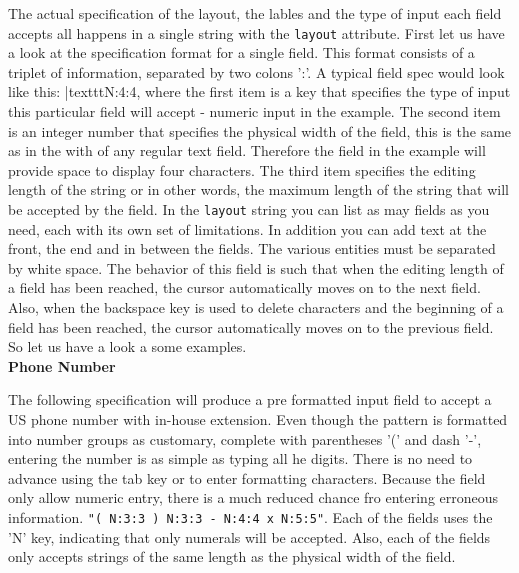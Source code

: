 The actual specification of the layout, the lables and the type of input
each field accepts all happens in a single string with the
\texttt{layout} attribute. First let us have a look at the specification
format for a single field. This format consists of a triplet of
information, separated by two colons ':'. A typical field spec would
look like this: |texttt{N:4:4}, where the first item is a key that
specifies the type of input this particular field will accept - numeric
input in the example. The second item is an integer number that
specifies the physical width of the field, this is the same as in the
with of any regular text field. Therefore the field in the example will
provide space to display four characters. The third item specifies the
editing length of the string or in other words, the maximum length of
the string that will be accepted by the field. In the \texttt{layout}
string you can list as may fields as you need, each with its own set of
limitations. In addition you can add text at the front, the end and in
between the fields. The various entities must be separated by white
space. The behavior of this field is such that when the editing length
of a field has been reached, the cursor automatically moves on to the
next field. Also, when the backspace key is used to delete characters
and the beginning of a field has been reached, the cursor automatically
moves on to the previous field. So let us have a look a some examples.\\

\textbf{Phone Number}

The following specification will produce a pre formatted input field to
accept a US phone number with in-house extension. Even though the
pattern is formatted into number groups as customary, complete with
parentheses '(' and dash '-', entering the number is as simple as typing
all he digits. There is no need to advance using the tab key or to enter
formatting characters. Because the field only allow numeric entry, there
is a much reduced chance fro entering erroneous information.
\texttt{"( N:3:3 ) N:3:3 - N:4:4 x N:5:5"}. Each of the fields uses the
'N' key, indicating that only numerals will be accepted. Also, each of
the fields only accepts strings of the same length as the physical width
of the field.\\

\begin{center}
\end{center}


